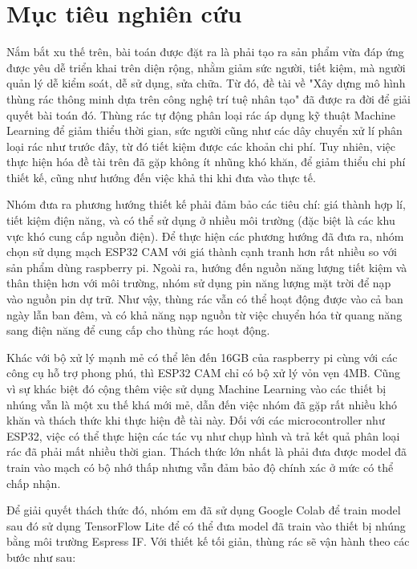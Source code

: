 \section{Mục tiêu nghiên cứu}
Nắm bắt xu thế trên, bài toán được đặt ra là phải tạo ra sản phẩm vừa đáp ứng được yêu dễ triển khai trên diện rộng, nhằm giảm sức người, tiết kiệm, mà người quản lý dễ kiểm soát, dễ sử dụng, sửa chữa.
Từ đó, đề tài về "Xây dựng mô hình thùng rác thông minh dựa trên công nghệ trí tuệ nhân tạo" đã được ra đời để giải quyết bài toán đó. 
Thùng rác tự động phân loại rác áp dụng kỹ thuật Machine Learning để giảm thiểu thời gian, sức người cũng như các dây chuyển xử lí phân loại rác như trước đây, từ đó tiết kiệm được các khoản chi phí.
Tuy nhiên, việc thực hiện hóa đề tài trên đã gặp không ít nhũng khó khăn, để giảm thiểu chi phí thiết kế, cũng như hướng đến việc khả thi khi đưa vào thực tế.

Nhóm đưa ra phương hướng thiết kế phải đảm bảo các tiêu chí: giá thành hợp lí, tiết kiệm điện năng, và có thể sử dụng ở nhiều môi trường (đặc biệt là các khu vực khó cung cấp nguồn điện).
Để thực hiện các phương hướng đã đưa ra, nhóm chọn sử dụng mạch ESP32 CAM với giá thành cạnh tranh hơn rất nhiều so với sản phẩm dùng raspberry pi.
Ngoài ra, hướng đến nguồn năng lượng tiết kiệm và thân thiện hơn với môi trường, nhóm sử dụng pin năng lượng mặt trời để nạp vào nguồn pin dự trữ.
Như vậy, thùng rác vẫn có thể hoạt động được vào cả ban ngày lẫn ban đêm, và có khả năng nạp nguồn từ việc chuyển hóa từ quang năng sang điện năng để cung cấp cho thùng rác hoạt động.

Khác với bộ xử lý mạnh mẻ có thể lên đến 16GB của raspberry pi cùng với các công cụ hỗ trợ phong phú, thì ESP32 CAM chỉ có bộ xử lý vỏn vẹn 4MB.
Cũng vì sự khác biệt đó cộng thêm việc sử dụng Machine Learning vào các thiết bị nhúng vẫn là một xu thế khá mới mẻ, dẫn đến việc nhóm đã gặp rất nhiều khó khăn và thách thức khi thực hiện đề tài này.
Đối với các microcontroller như ESP32, việc có thể thực hiện các tác vụ như chụp hình và trả kết quả phân loại rác đã phải mất nhiều thời gian.
Thách thức lớn nhất là phải đưa được model đã train vào mạch có bộ nhớ thấp nhưng vẫn đảm bảo độ chính xác ở mức có thể chấp nhận. 

Để giải quyết thách thức đó, nhóm em đã sử dụng Google Colab để train model sau đó sử dụng TensorFlow Lite để có thể đưa model đã train vào thiết bị nhúng bằng môi trường Espress IF.
Với thiết kế tối giản, thùng rác sẽ vận hành theo các bước như sau: 

